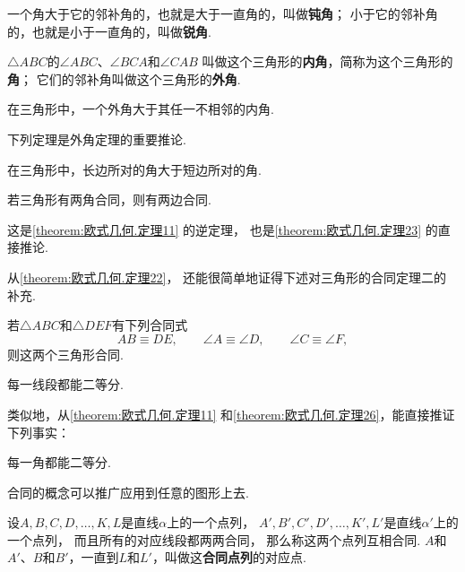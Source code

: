 \begin{definition}
一个角大于它的邻补角的，也就是大于一直角的，叫做\textbf{钝角}；
小于它的邻补角的，也就是小于一直角的，叫做\textbf{锐角}.
\end{definition}

\begin{definition}
\(\triangle ABC\)的\(\angle ABC\)、\(\angle BCA\)和\(\angle CAB\)
叫做这个三角形的\textbf{内角}，简称为这个三角形的\textbf{角}；
它们的邻补角叫做这个三角形的\textbf{外角}.
\end{definition}

\begin{theorem}[外角定理]\label{theorem:欧式几何.定理22}
在三角形中，一个外角大于其任一不相邻的内角.
\end{theorem}

下列定理是外角定理的重要推论.

\begin{theorem}\label{theorem:欧式几何.定理23}
在三角形中，长边所对的角大于短边所对的角.
\end{theorem}

\begin{theorem}\label{theorem:欧式几何.定理24}
若三角形有两角合同，则有两边合同.
\end{theorem}
这是\cref{theorem:欧式几何.定理11} 的逆定理，
也是\cref{theorem:欧式几何.定理23} 的直接推论.

从\cref{theorem:欧式几何.定理22}，
还能很简单地证得下述对三角形的合同定理二的补充.
\begin{theorem}\label{theorem:欧式几何.定理25}
若\(\triangle ABC\)和\(\triangle DEF\)有下列合同式\[
	AB \equiv DE, \qquad
	\angle A \equiv \angle D, \qquad
	\angle C \equiv \angle F,
\]
则这两个三角形合同.
\end{theorem}

\begin{theorem}\label{theorem:欧式几何.定理26}
每一线段都能二等分.
\end{theorem}

类似地，从\cref{theorem:欧式几何.定理11} 和\cref{theorem:欧式几何.定理26}，能直接推证下列事实：
\begin{theorem}
每一角都能二等分.
\end{theorem}

合同的概念可以推广应用到任意的图形上去.

\begin{definition}
设\(A,B,C,D,\dotsc,K,L\)是直线\(\alpha\)上的一个点列，
\(A',B',C',D',\dotsc,K',L'\)是直线\(\alpha'\)上的一个点列，
而且所有的对应线段都两两合同，
那么称这两个点列互相合同.
\(A\)和\(A'\)、\(B\)和\(B'\)，一直到\(L\)和\(L'\)，叫做这\textbf{合同点列}的对应点.
\end{definition}

